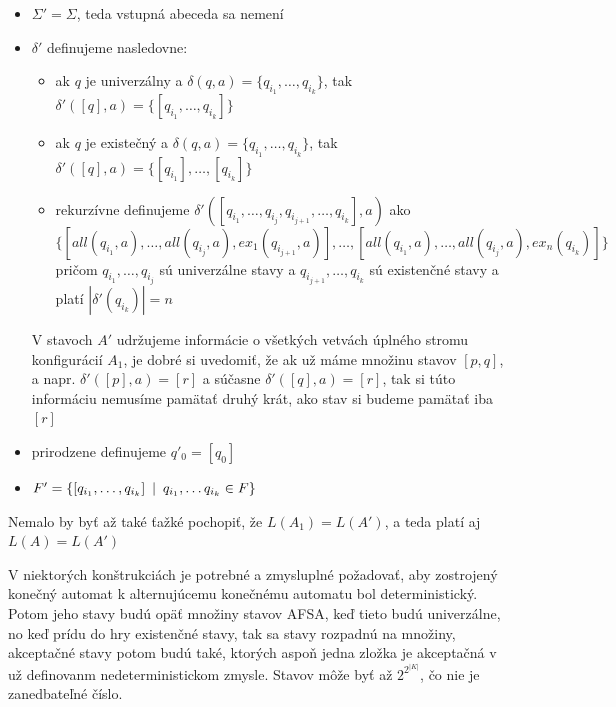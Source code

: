 \begin{dokaz}
\begin{itemize}
\[      \]
    \item $\Sigma'=\Sigma$, teda vstupná abeceda sa nemení
    \item $\delta'$ definujeme nasledovne:
      \begin{itemize}
        \item ak $q$ je univerzálny a $\delta(q,a)=\{q_{i_1},\dots,q_{i_k}\}$, tak
          $\delta'([q],a)=\{[q_{i_1},\dots,q_{i_k}]\}$
        \item ak $q$ je existečný a $\delta(q,a)=\{q_{i_1},\dots,q_{i_k}\}$, tak
          $\delta'([q],a)=\{[q_{i_1}],\dots,[q_{i_k}]\}$
        \item rekurzívne definujeme
          $\delta'([q_{i_1},\dots,q_{i_j},q_{i_{j+1}}, \dots,q_{i_k}],a)$
          ako\\ $\{[all(q_{i_1},a),
          \dots,all(q_{i_j},a),ex_1(q_{i_{j+1}},a)],
          \dots,[all(q_{i_1},a),\dots,all(q_{i_j},a),ex_n(q_{i_k})]\}$\\
          pri\-čom $q_{i_1},\dots,q_{i_j}$ sú univerzálne stavy a
          $q_{i_{j+1}},\dots,q_{i_k}$ sú existenčné stavy a platí
          $|\delta'(q_{i_k})|=n$
      \end{itemize}
      V stavoch $A'$ udržujeme informácie o všetkých vetvách úplného
      stromu konfigurácií $A_1$, je dobré si uvedomiť, že ak už máme
      množinu stavov $[p,q]$, a napr. $\delta'([p],a)=[r]$ a súčasne
      $\delta'([q],a)=[r]$, tak si túto informáciu nemusíme pamätať
      druhý krát, ako stav si budeme pamätať iba $[r]$
    \item prirodzene definujeme $q'_0=[q_0]$
    \item $F'=\{[q_{i_1},\dots,q_{i_k}]\enspace |\enspace q_{i_1},\dots q_{i_k}\in F\}$
  \end{itemize}
  Nemalo by byť až také ťažké pochopiť, že $L(A_1)=L(A')$, a teda
  platí aj $L(A)=L(A')$
\end{dokaz}

V niektorých konštrukciách je potrebné a zmysluplné požadovať, aby
zostrojený konečný automat k alternujúcemu konečnému automatu bol
deterministický. Potom jeho stavy budú opäť množiny stavov AFSA,
keď tieto budú univerzálne, no keď prídu do hry exis\-ten\-čné
stavy, tak sa stavy rozpadnú na množiny, akceptačné stavy potom
budú také, ktorých aspoň jedna zložka je akceptačná v už
definovanm nedeterministickom zmysle. Stavov môže byť až
$2^{2^{|K|}}$, čo nie je zanedbateľné číslo.

